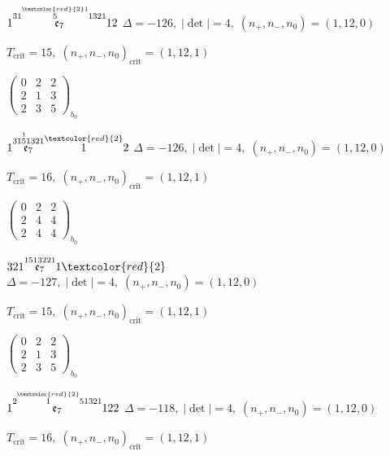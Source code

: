 \documentclass[10pt]{article}
\begin{document}
\smallskip

$1\overset{31\overset{\textcolor{red}{2}1}{5}1321}{\mathfrak{e}_7}12$ \quad $\Delta=-126,\; |\det|=4,\; (n_+,n_-,n_0)=(1,12,0)$

\hspace{1em}$T_{\text{crit}}=15,\; (n_+,n_-,n_0)_{\text{crit}}=(1,12,1)$

\hspace{2em}$\left(\begin{smallmatrix}0 & 2 & 2 \\ 2 & 1 & 3 \\ 2 & 3 & 5\end{smallmatrix}\right)_{\!b_0}$

$1\overset{31\overset{1}{5}1321}{\mathfrak{e}_7}\overset{\textcolor{red}{2}}{1}2$ \quad $\Delta=-126,\; |\det|=4,\; (n_+,n_-,n_0)=(1,12,0)$

\hspace{1em}$T_{\text{crit}}=16,\; (n_+,n_-,n_0)_{\text{crit}}=(1,12,1)$

\hspace{2em}$\left(\begin{smallmatrix}0 & 2 & 2 \\ 2 & 4 & 4 \\ 2 & 4 & 4\end{smallmatrix}\right)_{\!b_0}$

\smallskip

$321\overset{1513221}{\mathfrak{e}_7}1\textcolor{red}{2}$ \quad $\Delta=-127,\; |\det|=4,\; (n_+,n_-,n_0)=(1,12,0)$

\hspace{1em}$T_{\text{crit}}=15,\; (n_+,n_-,n_0)_{\text{crit}}=(1,12,1)$

\hspace{2em}$\left(\begin{smallmatrix}0 & 2 & 2 \\ 2 & 1 & 3 \\ 2 & 3 & 5\end{smallmatrix}\right)_{\!b_0}$

\smallskip

$1\overset{2\overset{\textcolor{red}{2}}{1}51321}{\mathfrak{e}_7}122$ \quad $\Delta=-118,\; |\det|=4,\; (n_+,n_-,n_0)=(1,12,0)$

\hspace{1em}$T_{\text{crit}}=16,\; (n_+,n_-,n_0)_{\text{crit}}=(1,12,1)$
\end{document}
